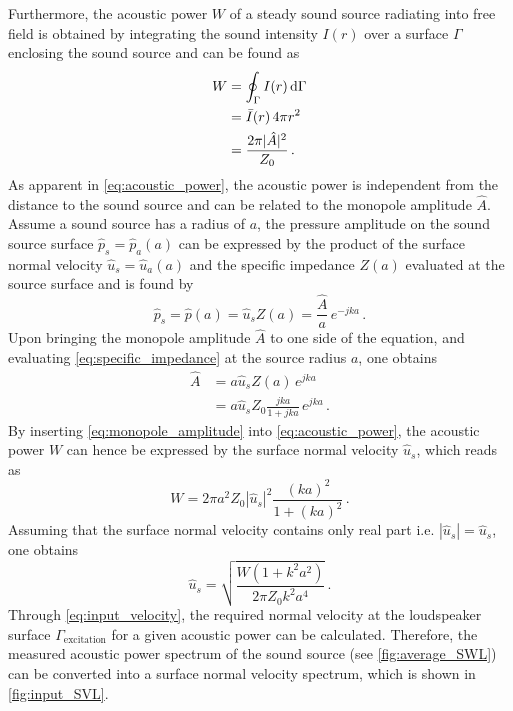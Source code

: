 Furthermore, the acoustic power $W$ of a steady sound source radiating into free field is obtained by integrating the sound intensity $I(r)$ over a surface $\Gamma$ enclosing the sound source and can be found as
\begin{align}
	W &= \oint_{\Gamma} I(r) \dif\Gamma \\
	  &= \bar{I}(r)\,4\pi r^2 \\
	  &= \frac{2\pi |\hat{A}|^2}{Z_0}\,. \label{eq:acoustic_power}
\end{align}
As apparent in \cref{eq:acoustic_power}, the acoustic power is independent from the distance to the sound source and can be related to the monopole amplitude $\hat{A}$. Assume a sound source has a radius of $a$, the pressure amplitude on the sound source surface $\hat{p}_s = \hat{p}_a(a)$ can be expressed by the product of the surface normal velocity $\hat{u}_s = \hat{u}_a(a)$ and the specific impedance $Z(a)$ evaluated at the source surface and is found by
\begin{equation}
	\hat{p}_s = \hat{p}(a) = \hat{u}_s Z(a) = \frac{\hat{A}}{a}\,e^{-jka}\,.
\end{equation}
Upon bringing the monopole amplitude $\hat{A}$ to one side of the equation, and evaluating \cref{eq:specific_impedance} at the source radius $a$, one obtains
\begin{align}
	\hat{A} &= a\hat{u}_s Z(a)\,e^{jka} \\
			&= a\hat{u}_s Z_0 \frac{jka}{1+jka}\,e^{jka}\,. \label{eq:monopole_amplitude}
\end{align}
By inserting \cref{eq:monopole_amplitude} into \cref{eq:acoustic_power}, the acoustic power $W$ can hence be expressed by the surface normal velocity $\hat{u}_s$, which reads as
\begin{equation}
	W = 2\pi a^2 Z_0 \left|\hat{u}_s\right|^2\frac{(ka)^2}{1+(ka)^2} \,.
\end{equation}
Assuming that the surface normal velocity contains only real part i.e. $\left|\hat{u}_s\right| = \hat{u}_s$, one obtains
\begin{equation}
	\hat{u}_s = \sqrt{\frac{W(1 + k^2a^2)}{2\pi Z_0 k^2a^4}}\,. \label{eq:input_velocity}
\end{equation}
Through \cref{eq:input_velocity}, the required normal velocity at the loudspeaker surface $\Gamma_{\text{excitation}}$ for a given acoustic power can be calculated. Therefore, the measured acoustic power spectrum of the sound source (see \cref{fig:average_SWL}) can be converted into a surface normal velocity spectrum, which is shown in \cref{fig:input_SVL}.

